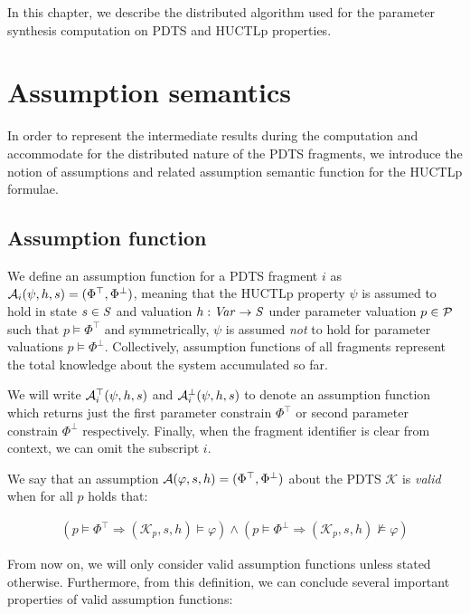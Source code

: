 In this chapter, we describe the distributed algorithm used for the parameter synthesis computation on \ac{PDTS} and \ac{HUCTLp} properties.

\section{Assumption semantics}

In order to represent the intermediate results during the computation and accommodate for the distributed nature of the \ac{PDTS} fragments, we introduce the notion of assumptions and related assumption semantic function for the \ac{HUCTLp} formulae.

\subsection{Assumption function}

We define an assumption function for a \ac{PDTS} fragment $i$ as $\mathcal{A}_i(\psi, h, s) = (\Phi^\top, \Phi^\bot)$, meaning that the \ac{HUCTLp} property $\psi$ is assumed to hold in state $s \in \mathit{S}$ and valuation $h : \mathit{Var} \to \mathit{S}$ under parameter valuation $p \in \mathcal{P}$ such that $p \models \Phi^\top$ and symmetrically, $\psi$ is assumed \emph{not} to hold for parameter valuations $p \models \Phi^\bot$. Collectively, assumption functions of all fragments represent the total knowledge about the system accumulated so far.

We will write $\mathcal{A}^\top_i(\psi, h, s)$ and $\mathcal{A}^\bot_i(\psi, h, s)$ to denote an assumption function which returns just the first parameter constrain $\Phi^\top$ or second parameter constrain $\Phi^\bot$ respectively. Finally, when the fragment identifier is clear from context, we can omit the subscript $i$.

We say that an assumption $\mathcal{A}(\varphi, s, h) = (\Phi^\top, \Phi^\bot)$ about the \ac{PDTS} $\mathcal{K}$ is \emph{valid} when for all $p$ holds that:

\begin{align*}
	(p \models \Phi^\top \Rightarrow (\mathcal{K}_p, s, h) \models \varphi) \land (p \models \Phi^\bot \Rightarrow (\mathcal{K}_p, s, h) \not\models \varphi) 
\end{align*}

From now on, we will only consider valid assumption functions unless stated otherwise. Furthermore, from this definition, we can conclude several important properties of valid assumption functions:

